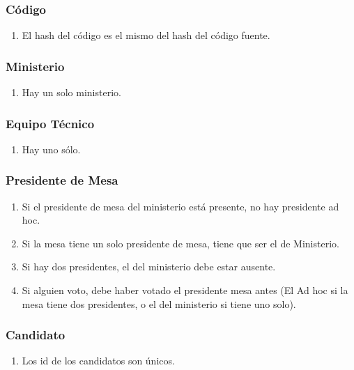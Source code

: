 \subsubsection*{C\'odigo}
\begin{enumerate}
\item El hash del código es el mismo del hash del código fuente.   
\end{enumerate}  

\subsubsection*{Ministerio}
\begin{enumerate}
\item Hay un solo ministerio.
\end{enumerate}

\subsubsection*{Equipo T\'ecnico}
\begin{enumerate}
\item Hay uno sólo.
\end{enumerate}

\subsubsection*{Presidente de Mesa}
\begin{enumerate}
\item Si el presidente de mesa del ministerio está presente, no hay presidente ad hoc.
\item Si la mesa tiene un solo presidente de mesa, tiene que ser el de Ministerio.
\item Si hay dos presidentes, el del ministerio debe estar ausente.
\item Si alguien voto, debe haber votado el presidente mesa antes (El Ad hoc si la mesa tiene dos presidentes, o el del ministerio si tiene uno solo).
\end{enumerate}

\subsubsection*{Candidato}
\begin{enumerate}
\item Los id de los candidatos son únicos.
\end{enumerate}
